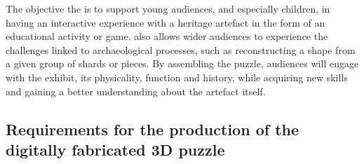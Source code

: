\documentclass[acmlarge,screen,dvipsnames]{acmart}
\begin{document}
 The objective  the  is to support young
audiences, and especially children, in having an interactive experience with a heritage artefact in the form of an educational
activity or game.  \KRedit[will] also allows wider audiences to experience the
challenges linked to archaeological processes, such as reconstructing
a shape from a given group of shards or pieces. By assembling the
puzzle, audiences will engage with the exhibit, its physicality,
function and history, while acquiring new skills and gaining a better
understanding about the artefact itself.

\subsection{Requirements for the production of the digitally fabricated 3D puzzle}
\end{document}
